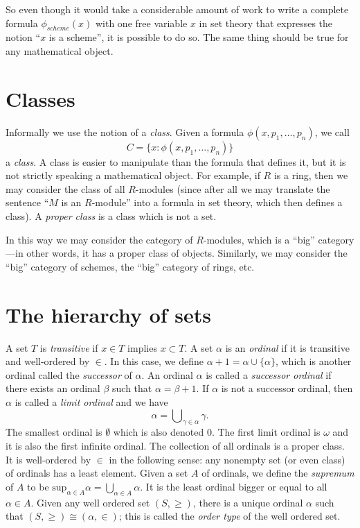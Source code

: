 \medskip\noindent
So even though it would take a considerable amount of work to write
a complete formula $\phi_{scheme}(x)$ with one free variable $x$ in set theory
that expresses the notion ``$x$ is a scheme'', it is possible to do so.
The same thing should be true for any mathematical object.

\section{Classes}
\label{section-classes}

\noindent
Informally we use the notion of a {\it class}. Given a formula
$\phi(x, p_1, \ldots, p_n)$, we call
$$
C = \{x : \phi(x, p_1, \ldots, p_n)\}
$$
a {\it class}. A class is easier to manipulate than the formula
that defines it, but it is not strictly speaking a mathematical
object. For example, if $R$ is a ring, then we may
consider the class of all $R$-modules (since after all we
may translate the sentence ``$M$ is an $R$-module''
into a formula in set theory, which then defines a class).
A {\it proper class} is a class which is not a set.

\medskip\noindent
In this way we may consider the category of $R$-modules,
which is a ``big'' category---in other words, it has a
proper class of objects. Similarly, we may consider
the ``big'' category of schemes, the ``big'' category
of rings, etc.

\section{The hierarchy of sets}
\label{section-sets-hierarchy}

\noindent
A set $T$ is {\it transitive} if $x\in T$ implies $x\subset T$.
A set $\alpha$ is an {\it ordinal} if it is transitive and well-ordered
by $\in$. In this case, we define $\alpha + 1 = \alpha \cup \{\alpha\}$,
which is another ordinal called the {\it successor} of $\alpha$.
An ordinal $\alpha$ is called a {\it successor ordinal} if
there exists an ordinal $\beta$ such that $\alpha = \beta + 1$.
If $\alpha$ is not a successor ordinal, then $\alpha$ is called
a {\it limit ordinal} and we have
$$
\alpha
=
\bigcup\nolimits_{\gamma \in \alpha} \gamma.
$$
The smallest ordinal is $\emptyset$ which is also denoted $0$.
The first limit ordinal is $\omega$ and it is also the first
infinite ordinal. The collection of all ordinals is a proper class.
It is well-ordered by $\in$ in the following sense: any nonempty set
(or even class) of ordinals has a least element.
Given a set $A$ of ordinals, we define the {\it supremum}
of $A$ to be $\text{sup}_{\alpha \in A} \alpha =
\bigcup_{\alpha \in A} \alpha$. It is the least ordinal bigger
or equal to all $\alpha \in A$.
Given any well ordered set $(S, \geq)$, there is a unique ordinal
$\alpha$ such that $(S, \geq) \cong (\alpha, \in)$; this is
called the {\it order type} of the well ordered set.

